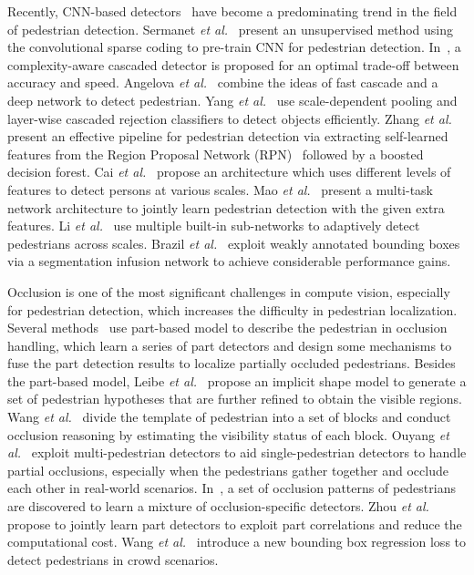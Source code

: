 \documentclass[journal]{IEEEtran}
\def\etal{{\em et al.}}
\begin{document}
Recently, CNN-based detectors~\cite{DBLP:conf/cvpr/SermanetKCL13,DBLP:conf/cvpr/HosangOBS15,DBLP:conf/cvpr/TianLWT15,DBLP:conf/iccv/BrazilYL17} have become a predominating trend in the field of pedestrian detection. Sermanet \etal~\cite{DBLP:conf/cvpr/SermanetKCL13} present an unsupervised method using the convolutional sparse coding to pre-train CNN for pedestrian detection. In~\cite{DBLP:conf/iccv/CaiSV15}, a complexity-aware cascaded detector is proposed for an optimal trade-off between accuracy and speed. Angelova \etal~\cite{DBLP:conf/bmvc/AngelovaKVOF15} combine the ideas of fast cascade and a deep network to detect pedestrian. Yang \etal~\cite{DBLP:conf/cvpr/YangCL16} use scale-dependent pooling and layer-wise cascaded rejection classifiers to detect objects efficiently. Zhang \etal~\cite{DBLP:conf/eccv/ZhangLLH16} present an effective pipeline for pedestrian detection via extracting self-learned features from the Region Proposal Network (RPN)~\cite{DBLP:journals/pami/RenHG017} followed by a boosted decision forest. Cai \etal~\cite{DBLP:conf/eccv/CaiFFV16} propose an architecture which uses different levels of features to detect persons at various scales. Mao \etal~\cite{DBLP:conf/cvpr/MaoXJC17} present a multi-task network architecture to jointly learn pedestrian detection with the given extra features. Li \etal~\cite{DBLP:journals/tmm/LiLSXFY18} use multiple built-in sub-networks to adaptively detect pedestrians across scales. Brazil \etal~\cite{DBLP:conf/iccv/BrazilYL17} exploit weakly annotated bounding boxes via a segmentation infusion network to achieve considerable performance gains.

Occlusion is one of the most significant challenges in compute vision, especially for pedestrian detection, which increases the difficulty in pedestrian localization. Several methods~\cite{DBLP:conf/cvpr/OuyangW12,DBLP:conf/iccv/TianLWT15,DBLP:conf/accv/ZhouY16,DBLP:conf/iccv/WuN05,DBLP:conf/eccv/DuanAL10} use part-based model to describe the pedestrian in occlusion handling, which learn a series of part detectors and design some mechanisms to fuse the part detection results to localize partially occluded pedestrians. Besides the part-based model, Leibe \etal~\cite{DBLP:conf/cvpr/LeibeSS05} propose an implicit shape model to generate a set of pedestrian hypotheses that are further refined to obtain the visible regions. Wang \etal~\cite{DBLP:conf/iccv/WangHY09} divide the template of pedestrian into a set of blocks and conduct occlusion reasoning by estimating the visibility status of each block. Ouyang \etal~\cite{DBLP:conf/cvpr/OuyangW13} exploit multi-pedestrian detectors to aid single-pedestrian detectors to handle partial occlusions, especially when the pedestrians gather together and occlude each other in real-world scenarios. In~\cite{DBLP:conf/cvpr/PepikSGS13}, a set of occlusion patterns of pedestrians are discovered to learn a mixture of occlusion-specific detectors. Zhou \etal~\cite{DBLP:conf/iccv/ZhouY17} propose to jointly learn part detectors to exploit part correlations and reduce the computational cost. Wang \etal~\cite{DBLP:journals/corr/abs-1711-07752} introduce a new bounding box regression loss to detect pedestrians in crowd scenarios.
\end{document}

